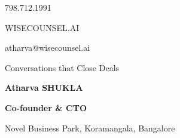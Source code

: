 \documentclass[9pt,a4paper]{memoir}
\begin{document}
\begin{raggedleft}
    \normalsize{798.712.1991} \hfill
\end{raggedleft}
\begin{raggedright}
    \Large{ WISECOUNSEL.AI } \\
\end{raggedright}
\begin{raggedleft}
    \scriptsize{atharva@wisecounsel.ai} \hfill
\end{raggedleft}
\begin{raggedright}
    \scriptsize{ Conversations that Close Deals }
\end{raggedright}
\begin{center}
    \vspace{28pt}
    \textbf{\Large{Atharva SHUKLA}}
\end{center}
\begin{center}
    \vspace{-6pt}
    \textbf{\small{Co-founder \& CTO}}
\end{center}
\begin{center}
    \vspace{25pt}
    \small{Novel Business Park, Koramangala, Bangalore}
\end{center}
\end{document}
